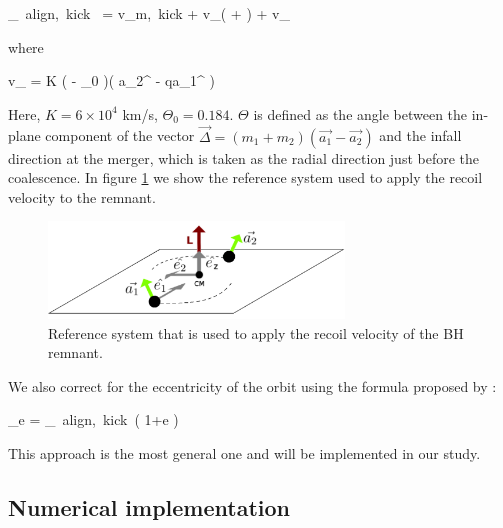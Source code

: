 \documentclass[a4,useAMS,usenatbib,usegraphicx,12pt]{article}
\begin{document}
{ _{\mbox{\tiny{ align, kick }}} = v_{\mbox{\tiny{m, kick}}}  + 
v_{\bot}( \cos{\xi} + \sin{\xi} ) + v_{\parallel} }

where

{ v_{\parallel} = K \cos( \Theta - \Theta_0 )( a_2^{\bot} - qa_1^{\bot} ) }

Here, $K = 6\times 10^4$ km/s, $\Theta_0 = 0.184$. $\Theta$ is defined as the angle between 
the in-plane component of the vector $\vec{\Delta} = (m_1+m_2)(\vec{a_1}-\vec{a_2})$ and the infall 
direction at the merger, which is taken as the radial direction just before the coalescence. In figure
\ref{fig:RecoilReferenceSystem} we show the reference system used to apply the recoil velocity to the
remnant.

\begin{figure}[htbp]
\centering
\includegraphics[width=0.7\textwidth]
{./figures/BinarySystem.png}
\caption{\small{Reference system that is used to apply the recoil velocity of the BH remnant.}}

\label{fig:RecoilReferenceSystem}
\end{figure}

We also correct for the eccentricity of the orbit using the formula proposed by \citep{Sopuerta2007}:

{ _{e} = _{\mbox{\tiny{ align, kick }}}( 1+e ) }

This approach is the most general one and will be implemented in our study.


\subsection{Numerical implementation}
\end{document}

